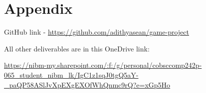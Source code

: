 \documentclass[12pt,a4paper]{article}
\begin{document}
\newpage
\section{Appendix}

GitHub link - \url{https://github.com/adithyasean/game-project}

\vspace{1em}
All other deliverables are in this OneDrive link: 

\url{https://nibm-my.sharepoint.com/:f:/g/personal/cobsccomp242p-065_student_nibm_lk/IgC1z1sqJ0tgQ5aY-_paQP58ASlJvXpEXgEXOfWhQnmc9rQ?e=xGp5Ho}
\end{document}
